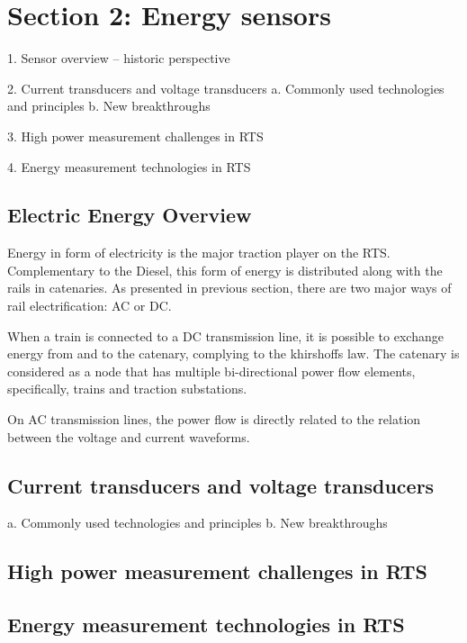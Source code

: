 


\section{Section 2: Energy sensors}

1.	Sensor overview – historic perspective

2.	Current transducers and voltage transducers
a.	Commonly used technologies and principles
b.	New breakthroughs

3.	High power measurement challenges in RTS

4.	Energy measurement technologies in RTS 


\subsection{Electric Energy Overview}

Energy in form of electricity is the major traction player on the RTS. 
Complementary to the Diesel, this form of energy is distributed along with the rails in catenaries.
As presented in previous section, there are two major ways of rail electrification: AC or DC.

When a train is connected to a DC transmission line, it is possible to exchange energy from and to the catenary, complying to the khirshoffs law. The catenary is considered as a node that has multiple bi-directional power flow elements, specifically, trains and traction substations.

On AC transmission lines, the power flow is directly related to the relation between the voltage and current waveforms. 

\subsection{Current transducers and voltage transducers}
	
a.	Commonly used technologies and principles
b.	New breakthroughs

\subsection{High power measurement challenges in RTS}	

\subsection{Energy measurement technologies in RTS }